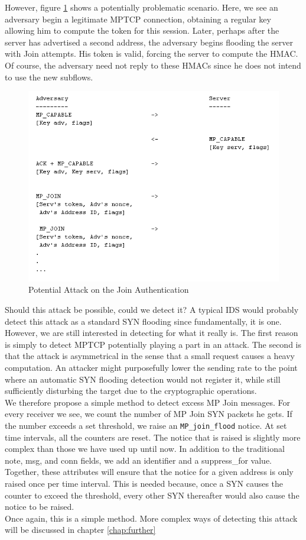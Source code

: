 However, figure \ref{pic:join flood} shows a potentially problematic scenario. Here, we see an adversary begin a legitimate MPTCP connection, obtaining a regular key allowing him to compute the token for this session. Later, perhaps after the server has advertised a second address, the adversary begins flooding the server with Join attempts. His token is valid, forcing the server to compute the HMAC. Of course, the adversary need not reply to these HMACs since he does not intend to use the new subflows. \\

\begin{figure}[!t]
\centering
\includegraphics[scale = 0.75]{Figures/joinflood.png}
\caption{Potential Attack on the Join Authentication}
\label{pic:join flood}
\end{figure}

Should this attack be possible, could we detect it? A typical IDS would probably detect this attack as a standard SYN flooding since fundamentally, it is one. However, we are still interested in detecting for what it really is. The first reason is simply to detect MPTCP potentially playing a part in an attack. The second is that the attack is asymmetrical in the sense that a small request causes a heavy computation. An attacker might purposefully lower the sending rate to the point where an automatic SYN flooding detection would not register it, while still sufficiently disturbing the target due to the cryptographic operations.\\

We therefore propose a simple method to detect excess MP Join messages. For every receiver we see, we count the number of MP Join SYN packets he gets. If the number exceeds a set threshold, we raise an \texttt{MP\_join\_flood} notice. At set time intervals, all the counters are reset. The notice that is raised is slightly more complex than those we have used up until now. In addition to the traditional note, msg, and conn fields, we add an identifier and a suppress\_for value. Together, these attributes will ensure that the notice for a given address is only raised once per time interval. This is needed because, once a SYN causes the counter to exceed the threshold, every other SYN thereafter would also cause the notice to be raised. \\

Once again, this is a simple method. More complex ways of detecting this attack will be discussed in chapter \ref{chap:further}

